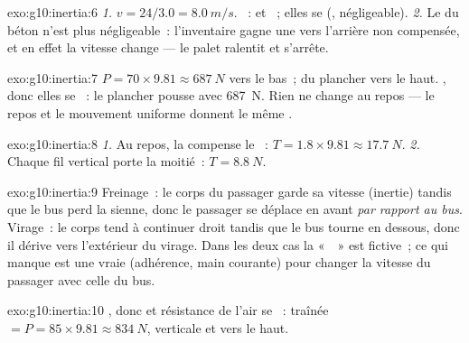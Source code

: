 \begin{solution}{exo:g10:inertia:6}
\emph{1.} $v = 24/3.0 = \qty{8.0}{m/s}$. ~:
 et ~; elles se
 (,  négligeable). \emph{2.} Le
 du béton n'est plus négligeable~: l'inventaire
gagne une  vers l'arrière non compensée, et en effet la
vitesse change --- le palet ralentit et s'arrête.
\end{solution}

\begin{solution}{exo:g10:inertia:7}
 $P = 70 \times 9.81 \approx \qty{687}{N}$ vers le bas~;
 du plancher vers le haut. , donc elles se ~: le
plancher pousse avec \qty{687}{N}. Rien ne change au repos --- le repos
et le mouvement uniforme donnent le même .
\end{solution}

\begin{solution}{exo:g10:inertia:8}
\emph{1.} Au repos, la  compense le
~: $T = 1.8 \times 9.81 \approx \qty{17.7}{N}$.
\emph{2.} Chaque fil vertical porte la moitié~: $T = \qty{8.8}{N}$.
\end{solution}

\begin{solution}{exo:g10:inertia:9}
Freinage~: le corps du passager garde sa vitesse (inertie) tandis que
le bus perd la sienne, donc le passager se déplace en avant
\emph{par rapport au bus}. Virage~: le corps tend à continuer droit
tandis que le bus tourne en dessous, donc il dérive vers l'extérieur
du virage. Dans les deux cas la «~~» est fictive~; ce
qui manque est une vraie  (adhérence, main courante)
pour changer la vitesse du passager avec celle du bus.
\end{solution}

\begin{solution}{exo:g10:inertia:10}
, donc  et
résistance de l'air se ~: traînée
$= P = 85 \times 9.81 \approx \qty{834}{N}$, verticale et vers le
haut.
\end{solution}

